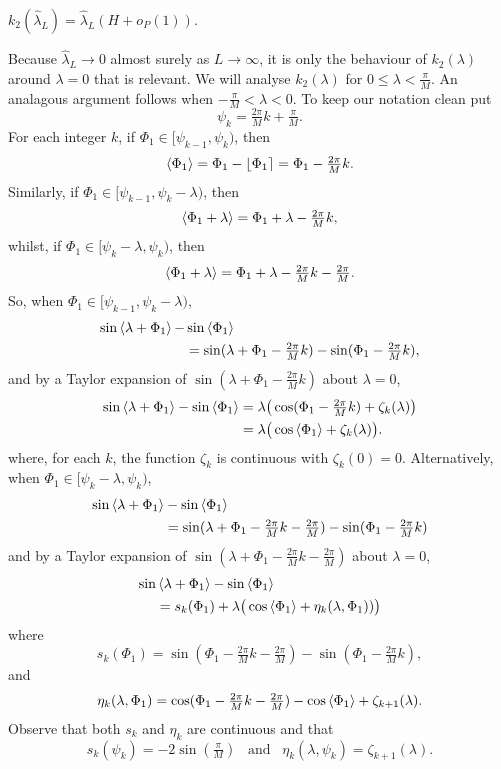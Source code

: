 \documentclass[journal]{IEEEtran}
\begin{document}
\begin{lemma}\label{lem:k2conv}
$k_2(\hat{\lambda}_L) = \hat{\lambda}_L ( H + o_P(1) ).$
\end{lemma}
\begin{IEEEproof}
Because $\hat{\lambda}_L \rightarrow 0$ almost surely as $L\rightarrow\infty$, it is only the behaviour of $k_2(\lambda)$ around $\lambda = 0$ that is relevant.  We will analyse $k_2(\lambda)$ for $0 \leq \lambda < \tfrac{\pi}{M}$.  An analagous argument follows when $-\tfrac{\pi}{M} < \lambda < 0$.  To keep our notation clean put
\[
\psi_k = \tfrac{2\pi}{M}k + \tfrac{\pi}{M}.
\]
For each integer $k$, if $\Phi_1 \in [\psi_{k-1}, \psi_k)$, then
\[
\left\langle \Phi_1 \right\rangle = \Phi_1 - {\left\lfloor \Phi_1 \right\rceil} = \Phi_1 - \tfrac{2\pi}{M}k.
\]
Similarly, if $\Phi_1 \in  [\psi_{k-1}, \psi_{k} - \lambda)$, then
\[
\left\langle \Phi_1 + \lambda \right\rangle = \Phi_1 + \lambda - \tfrac{2\pi}{M}k,
\]
whilst, if $\Phi_1 \in [\psi_{k} - \lambda, \psi_{k})$, then
\[
\left\langle \Phi_1 + \lambda \right\rangle = \Phi_1 + \lambda - \tfrac{2\pi}{M}k - \tfrac{2\pi}{M}.
\]
So, when $\Phi_1 \in [\psi_{k-1}, \psi_{k} - \lambda )$,
\begin{align*}
\sin\left\langle \lambda + \Phi_1 \right\rangle - &\sin\left\langle \Phi_1 \right\rangle \\
&= \sin(\lambda + \Phi_1 - \tfrac{2\pi}{M}k) - \sin(\Phi_1 - \tfrac{2\pi}{M}k),
\end{align*}
and by a Taylor expansion of $\sin(\lambda + \Phi_1 - \tfrac{2\pi}{M}k)$ about $\lambda = 0$, 
\begin{align*}
\sin\left\langle \lambda + \Phi_1 \right\rangle - \sin\left\langle \Phi_1 \right\rangle &= \lambda\big(\cos(\Phi_1 - \tfrac{2\pi}{M}k) + \zeta_k(\lambda)\big) \\
&= \lambda\big(\cos\left\langle \Phi_1 \right\rangle + \zeta_k(\lambda)\big).
\end{align*}
where, for each $k$, the function $\zeta_k$ is continuous with $\zeta_k(0) = 0$.  Alternatively, when $\Phi_1 \in [ \psi_{k} - \lambda,\psi_{k})$,
\begin{align*}
\sin\left\langle \lambda + \Phi_1 \right\rangle &- \sin\left\langle \Phi_1 \right\rangle \\
&= \sin(\lambda + \Phi_1 - \tfrac{2\pi}{M}k - \tfrac{2\pi}{M}) - \sin(\Phi_1 - \tfrac{2\pi}{M}k)
\end{align*}
and by a Taylor expansion of $\sin(\lambda + \Phi_1 - \tfrac{2\pi}{M}k - \tfrac{2\pi}{M})$ about $\lambda = 0$,
\begin{align*}
\sin&\left\langle \lambda + \Phi_1 \right\rangle - \sin\left\langle \Phi_1 \right\rangle \\
&= s_k(\Phi_1) + \lambda\big(\cos\left\langle \Phi_1 \right\rangle + \eta_k(\lambda, \Phi_1)  )\big)
\end{align*}
where
\[
s_k(\Phi_1) = \sin(\Phi_1 - \tfrac{2\pi}{M}k - \tfrac{2\pi}{M}) - \sin(\Phi_1 - \tfrac{2\pi}{M}k),
\]
and
\[
\eta_k(\lambda, \Phi_1) = \cos(\Phi_1 - \tfrac{2\pi}{M}k - \tfrac{2\pi}{M}) - \cos\left\langle \Phi_1 \right\rangle + \zeta_{k+1}(\lambda).
\]
Observe that both $s_k$ and $\eta_k$ are continuous and that 
\[
s_k(\psi_{k}) = -2\sin(\tfrac{\pi}{M}) \;\;\; \text{and} \;\;\; \eta_k(\lambda,\psi_k) = \zeta_{k+1}(\lambda).
\]


\end{IEEEproof}
\end{document}
